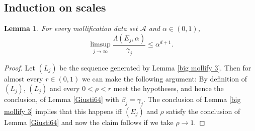 \documentclass[reqno,12pt,letterpaper]{amsart}
\newtheorem{lemma}[theorem]{Lemma}
\theoremstyle{definition}
\numberwithin{equation}{section}
\begin{document}
\subsection{Induction on scales}
\begin{lemma}\label{induction 1}
For every mollification data set $\mathcal A$ and $\alpha \in (0, 1)$,
$$\limsup_{j \to \infty} \frac{\Lambda(E_j, \alpha)}{\gamma_j} \leq \alpha^{d + 1}.$$
\end{lemma}
\begin{proof}
Let $(L_j)$ be the sequence generated by Lemma \ref{big mollify 3}.
Then for almost every $r \in (0, 1)$ we can make the following argument:
By definition of $(L_j)$, $(L_j)$ and every $0 < \rho < r$ meet the hypotheses, and hence the conclusion, of Lemma \ref{Giusti64} with $\beta_j = \gamma_j$.
The conclusion of Lemma \ref{big mollify 3} implies that this happens iff $(E_j)$ and $\rho$ satisfy the conclusion of Lemma \ref{Giusti64} and now the claim follows if we take $\rho \to 1$.
\end{proof}
\end{document}
